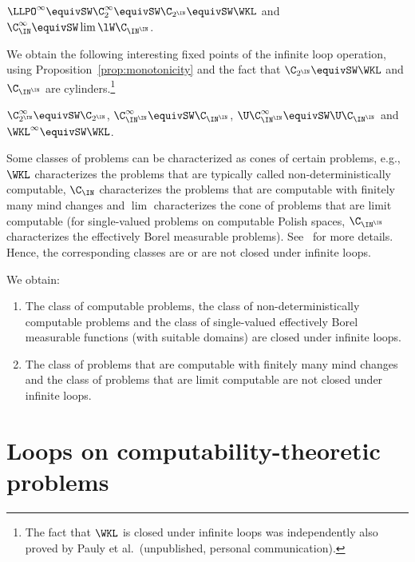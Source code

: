 \documentclass{lmcs}
\begin{document}
\begin{cor}
$\LLPO^\infty\equivSW\C_2^\infty\equivSW\C_{2^\IN}\equivSW\WKL$ and $\C_\IN^\infty\equivSW\lim\lW\C_{\IN^\IN}$.
\end{cor}

\noindent
We obtain the following interesting fixed points of the infinite loop operation, 
using Proposition~\ref{prop:monotonicity} and the fact
that $\C_{2^\IN}\equivSW\WKL$ and $\C_{\IN^\IN}$ are cylinders.\footnote{The fact that $\WKL$ 
is closed under infinite loops was independently also proved by Pauly et al.\ (unpublished, personal communication).}

\begin{cor}
$\C_{2^\IN}^\infty\equivSW\C_{2^\IN}$, $\C_{\IN^\IN}^\infty\equivSW\C_{\IN^\IN}$, $\U\C_{\IN^\IN}^\infty\equivSW\U\C_{\IN^\IN}$ and $\WKL^\infty\equivSW\WKL$.
\end{cor}

\noindent
Some classes of problems can be characterized as cones of certain problems, e.g., $\WKL$ characterizes
the problems that are typically called non-deterministically computable, $\C_\IN$ characterizes the problems
that are computable with finitely many mind changes and $\lim$ characterizes the cone of problems
that are limit computable (for single-valued problems on computable Polish spaces, $\C_{\IN^\IN}$ characterizes
the effectively Borel measurable problems). See~\cite{BBP12} for more details.
Hence, the corresponding classes are or are not closed under infinite loops.

\begin{cor}
We obtain:
\begin{enumerate} 
\item The class of computable problems, the class of non-deterministically computable problems
and the class of single-valued effectively Borel measurable functions (with suitable domains) are closed
under infinite loops.
\item The class of problems that are computable with finitely many mind changes and the class
of problems that are limit computable are not closed under infinite loops.
\end{enumerate}
\end{cor}


\section{Loops on computability-theoretic problems}
\label{sec:NON}
\end{document}
